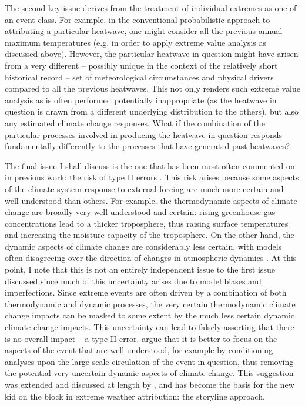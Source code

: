     The second key issue derives from the treatment of individual extremes as one of an event class. For example, in the conventional probabilistic approach to attributing a particular heatwave, one might consider all the previous annual maximum temperatures (e.g. in order to apply extreme value analysis as discussed above). However, the particular heatwave in question might have arisen from a very different -- possibly unique in the context of the relatively short historical record -- set of meteorological circumstances and physical drivers compared to all the previous heatwaves. This not only renders such extreme value analysis as is often performed potentially inappropriate (as the heatwave in question is drawn from a different underlying distribution to the others), but also any estimated climate change responses. What if the combination of the particular processes involved in producing the heatwave in question responds fundamentally differently to the processes that have generated past heatwaves?
    
    The final issue I shall discuss is the one that has been most often commented on in previous work: the risk of type II errors \citep{shepherd_common_2016,trenberth_attribution_2015}. This risk arises because some aspects of the climate system response to external forcing are much more certain and well-understood than others. For example, the thermodynamic aspects of climate change are broadly very well understood and certain: rising greenhouse gas concentrations lead to a thicker troposphere, thus raising surface temperatures and increasing the moisture capacity of the troposphere. On the other hand, the dynamic aspects of climate change are considerably less certain, with models often disagreeing over the direction of changes in atmospheric dynamics \citep{masato_winter_2013}. At this point, I note that this is not an entirely independent issue to the first issue discussed since much of this uncertainty arises due to model biases and imperfections. Since extreme events are often driven by a combination of both thermodynamic and dynamic processes, the very certain thermodynamic climate change impacts can be masked to some extent by the much less certain dynamic climate change impacts. This uncertainty can lead to falsely asserting that there is no overall impact -- a type II error. \citet{trenberth_attribution_2015} argue that it is better to focus on the aspects of the event that are well understood, for example by conditioning analyses upon the large scale circulation of the event in question, thus removing the potential very uncertain dynamic aspects of climate change. This suggestion was extended and discussed at length by \citet{shepherd_common_2016}, and has become the basis for the new kid on the block in extreme weather attribution: the storyline approach.

